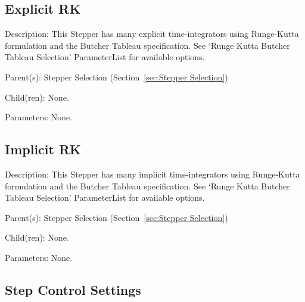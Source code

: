\subsection{Explicit RK}
\label{sec:Explicit RK}

\begin{list}{}
  {\setlength{\leftmargin}{1.0in}
   \setlength{\labelwidth}{0.75in}
   \setlength{\labelsep}{0.125in}}
  \item[Description:]
    This Stepper has many explicit time-integrators using Runge-Kutta formulation and the Butcher Tableau specification.  See `Runge Kutta Butcher Tableau Selection' ParameterList for available options.
  \item[Parent(s):]
    Stepper Selection (Section~\ref{sec:Stepper Selection})
  \item[Child(ren):]
    None. 
  \item[Parameters:]
    None. 
\end{list}

\subsection{Implicit RK}
\label{sec:Implicit RK}

\begin{list}{}
  {\setlength{\leftmargin}{1.0in}
   \setlength{\labelwidth}{0.75in}
   \setlength{\labelsep}{0.125in}}
  \item[Description:]
    This Stepper has many implicit time-integrators using Runge-Kutta formulation and the Butcher Tableau specification.  See `Runge Kutta Butcher Tableau Selection' ParameterList for available options.
  \item[Parent(s):]
    Stepper Selection (Section~\ref{sec:Stepper Selection})
  \item[Child(ren):]
    None. 
  \item[Parameters:]
    None. 
\end{list}

\subsection{Step Control Settings}
\label{sec:Step Control Settings}

